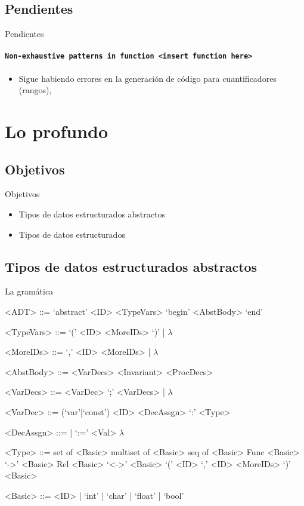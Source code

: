 \documentclass{beamer}
\begin{document}
\subsection{Pendientes}
\begin{frame}{Pendientes}
\framesubtitle{\texttt{Non-exhaustive patterns in function <insert function here>}}
\begin{itemize}
  \item Sigue habiendo errores en la generación de código para cuantificadores (rangos),
\end{itemize}
\end{frame}

\section{Lo profundo}
\subsection{Objetivos}
\begin{frame}{Objetivos}
\begin{itemize}
  \item Tipos de datos estructurados abstractos
  \item Tipos de datos estructurados
\end{itemize}
\end{frame}

\subsection{Tipos de datos estructurados abstractos}
\begin{frame}{La gramática}
\scriptsize
\begin{grammar}

<ADT> ::= `abstract' <ID> <TypeVars> `begin' <AbstBody> `end'

<TypeVars> ::= `(' <ID> <MoreIDs> `)' | $\lambda$

<MoreIDs> ::= `,' <ID> <MoreIDs> | $\lambda$

<AbstBody> ::= <VarDecs> <Invariant> <ProcDecs>

<VarDecs> ::= <VarDec> `;' <VarDecs> | $\lambda$

<VarDec> ::= (`var'|`const') <ID> <DecAssgn> `:' <Type>

<DecAssgn> ::= | `:=' <Val> $\lambda$

<Type> ::= set of <Basic>
\alt multiset of <Basic>
\alt seq of <Basic>
\alt Func <Basic> `->' <Basic>
\alt Rel <Basic> `<->' <Basic>
\alt `(' <ID> `,' <ID> <MoreIDs> `)'
\alt <Basic>

<Basic> ::= <ID> | `int' | `char' | `float' | `bool'

\end{grammar}
\end{frame}
\end{document}
